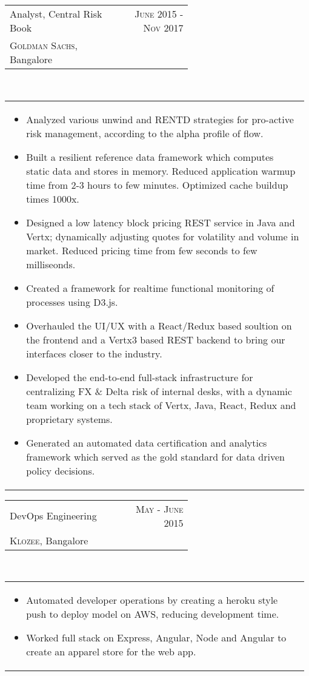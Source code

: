 \documentclass[a4paper]{article} %
\newcommand{\verticalspacing}{-0.25cm}
\newcommand{\bulletspace}{0.7cm}
\newcommand{\projectheadspacing}{6.9cm}
\newcommand{\cproject}[5]{%
    \begin{tabular}{p{0.60\linewidth}r}
        \textcolor{NavyBlue}{\small #2} & \multicolumn{1}{m{ \projectheadspacing{} }}{\raggedleft \small {\textsc{#1}}}\\
        \small {#3} & \small {#4}
    \end{tabular}\\
    \begin{tabular}{p{0.98\linewidth}}
    \vspace{-0.3cm}
        \small{#5}
    \end{tabular}
    \vspace{\verticalspacing{}}
}
\begin{document}
\cproject
      {June 2015 - Nov 2017}
      {Analyst, Central Risk Book}
      {\textsc{Goldman Sachs}, Bangalore}
      {}
      {%
        \begin{itemize}[leftmargin=\bulletspace{}]
          \item Analyzed various unwind and RENTD strategies for pro-active risk management, according
            to the alpha profile of flow.
          \item Built a resilient reference data framework which computes static data and stores in memory.
            Reduced application warmup time from 2-3 hours to few minutes. Optimized cache buildup times 1000x.
          \item Designed a low latency block pricing REST service in Java and Vertx; dynamically adjusting
            quotes for volatility and volume in market.
            Reduced pricing time from few seconds to few milliseonds.
          \item Created a framework for realtime functional monitoring of processes using D3.js.
          \item Overhauled the UI/UX with a React/Redux based soultion on the frontend and a Vertx3 based REST
            backend to bring our interfaces closer to the industry.
          \item Developed the end-to-end full-stack infrastructure for centralizing FX \& Delta risk of
            internal desks, with a dynamic team working on a tech stack of Vertx, Java, React, Redux
            and proprietary systems.
          \item Generated an automated data certification and analytics framework
              which served as the gold standard for data driven policy decisions.
        \end{itemize}
      }

\cproject
      {May - June 2015}
      {DevOps Engineering}
      {\textsc{Klozee}, Bangalore}
      {}
      {%
        \begin{itemize}[leftmargin=\bulletspace{}]
          \item Automated developer operations by creating a heroku style push to deploy model on AWS,
              reducing development time.
          \item Worked full stack on Express, Angular, Node and Angular to create an apparel store for the web app.
        \end{itemize}
      }
\end{document}
